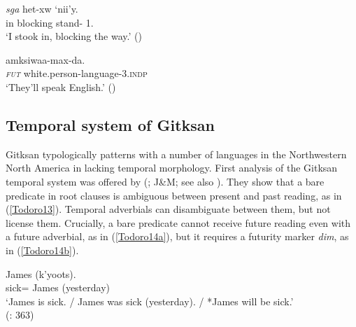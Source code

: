 \documentclass[output=paper]{langscibook}
\begin{document}
\begin{exe}
\ex \label{Todoro12}
\begin{xlist}

\ex \label{Todoro12a}
 {\textit{sga}} {het-xw} {`nii'y.}\\
    in blocking stand-{\pass} 1{\sg}.{\seriesIII}\\
\glt `I stook in, blocking the way.' (\citealt{rigsby1986a}) 

\ex \label{Todoro12b}
 amksiwaa-max-da. \\
    \textsc{\textit{fut}} white.person-language-3{\pl}.\textsc{indp}\\
\glt `They'll speak English.' (\citealt{rigsby1986a}) 

\end{xlist}
\end{exe}

\subsection{Temporal system of Gitksan}

Gitksan typologically patterns with a number of languages in the Northwestern North America in lacking temporal morphology. First analysis of the Gitksan temporal system was offered by \citeauthor{johannsdottirmatthewson2007a} (\citeyear{johannsdottirmatthewson2007a}; J\&M; see also \citealt{matthewson2013a}). They show that a bare predicate in root clauses is ambiguous between present and past reading, as in (\ref{Todoro13}). Temporal adverbials can disambiguate between them, but not license them. Crucially, a bare predicate cannot receive future reading even with a future adverbial, as in (\ref{Todoro14a}), but it requires a futurity marker \emph{dim}, as in (\ref{Todoro14b}). 

\begin{exe}
\ex \label{Todoro13}
 {James} {(k'yoots).} \\
    sick={\pn} James (yesterday)\\
\glt `James is sick. / James was sick (yesterday). / *James will be sick.' \\ (\citealt{matthewson2013a}: 363)

\ex \label{Todoro14}
\begin{xlist}



\end{xlist}
\end{exe}
\end{document}
